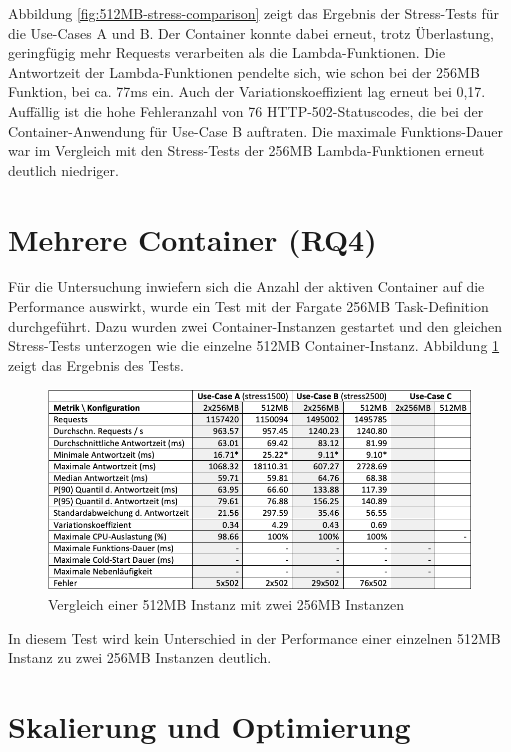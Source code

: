 Abbildung \ref{fig:512MB-stress-comparison} zeigt das Ergebnis der Stress-Tests für die Use-Cases A und B. Der Container konnte dabei erneut, trotz Überlastung, geringfügig mehr Requests verarbeiten als die Lambda-Funktionen. Die Antwortzeit der Lambda-Funktionen pendelte sich, wie schon bei der 256MB Funktion, bei ca. 77ms ein. Auch der Variationskoeffizient lag erneut bei 0,17. Auffällig ist die hohe Fehleranzahl von 76 HTTP-502-Statuscodes, die bei der Container-Anwendung für Use-Case B auftraten. Die maximale Funktions-Dauer war im Vergleich mit den Stress-Tests der 256MB Lambda-Funktionen erneut deutlich niedriger.

\section{Mehrere Container (RQ4)}
Für die Untersuchung inwiefern sich die Anzahl der aktiven Container auf die Performance auswirkt, wurde ein Test mit der Fargate 256MB Task-Definition durchgeführt. Dazu wurden zwei Container-Instanzen gestartet und den gleichen Stress-Tests unterzogen wie die einzelne 512MB Container-Instanz. Abbildung \ref{fig:fargate-512-vs-2x256-stress-comparison} zeigt das Ergebnis des Tests.

\begin{figure}[H]
    \includegraphics[width=\textwidth]{img/fargate-512-vs-2x256-stress-comparison.png}
    \caption[Vergleich einer 512MB Instanz mit zwei 256MB Instanzen]{Vergleich einer 512MB Instanz mit zwei 256MB Instanzen}
    \label{fig:fargate-512-vs-2x256-stress-comparison}
\end{figure}

In diesem Test wird kein Unterschied in der Performance einer einzelnen 512MB Instanz zu zwei 256MB Instanzen deutlich.


\section{Skalierung und Optimierung}
